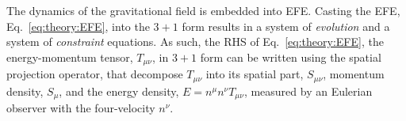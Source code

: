 



The dynamics of the gravitational field is embedded into \ac{EFE}. 
Casting the \ac{EFE}, Eq.~\eqref{eq:theory:EFE}, into the $3+1$ form results in a 
system of \textit{evolution} and 
a system of \textit{constraint} equations.
%
%
%
%
%
As such, the \ac{RHS} of Eq.~\eqref{eq:theory:EFE}, the energy-momentum tensor, 
$T_{\mu\nu}$, in $3+1$ form can be written using the spatial projection operator, 
that decompose $T_{\mu\nu}$ into its 
spatial part, $S_{\mu\nu}$, 
momentum density, $S_{\mu}$, and 
the energy density, $E=n^{\mu}n^{\nu}T_{\mu\nu}$, 
measured by an Eulerian observer with the four-velocity $n^{\nu}$.


